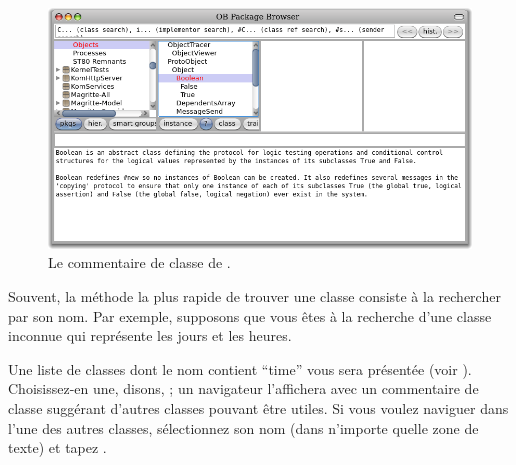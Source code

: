 \documentclass[a4paper,10pt,twoside]{book}
\begin{document}
\begin{figure}[hbt]
\centerline {\includegraphics[width=\textwidth]{classComment}}
\caption{Le commentaire de classe de .
}
\end{figure}

Souvent, la méthode la plus rapide de trouver une classe consiste
à la rechercher par son nom. Par exemple, supposons que vous êtes
à la recherche d'une classe inconnue qui représente les jours et
les heures.%

\noindent
Une liste de classes dont le nom contient ``time'' vous sera
présentée (voir ). Choisissez-en une, disons,
; 
un navigateur l'affichera avec un commentaire de classe
suggérant d'autres classes pouvant être utiles. Si vous voulez
naviguer dans l'une des autres classes, sélectionnez son nom (dans
n'importe quelle zone de texte) et tapez .
\end{document}
